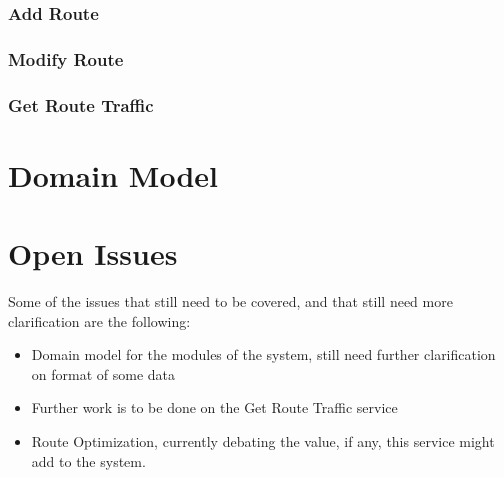 \documentclass[a4paper,12pt]{article}
\begin{document}
\subsubsection{Add Route}
\subsubsection{Modify Route}
\subsubsection{Get Route Traffic}

\section{Domain Model}

\section{Open Issues}
Some of the issues that still need to be covered, and that still need more clarification are the following:
\begin{itemize}
\item Domain model for the modules of the system, still need further clarification on format of some data
\item Further work is to be done on the Get Route Traffic service
\item Route Optimization, currently debating the value, if any, this service might add to the system.
\end{itemize}
\end{document}
